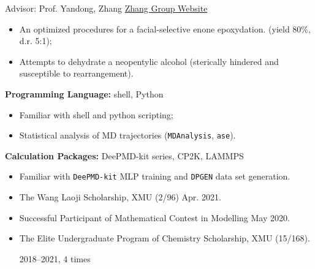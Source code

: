\vspace{5mm}



{\noindent Advisor: Prof. Yandong, Zhang  \hfill \href{https://zhanglab.xmu.edu.cn/}{Zhang Group Website}}


\begin{itemize}
    \item An optimized procedures for a facial-selective enone epoxydation. (yield 80\%, d.r. 5:1);
    \item Attempts to dehydrate a neopentylic alcohol (sterically hindered and susceptible to rearrangement).
\end{itemize}


\vspace{5mm}

\sectionrule
{\noindent \textbf{Programming Language:} }{shell, Python}
\begin{itemize}
    \item Familiar with shell and python scripting; 
    \item Statistical analysis of MD trajectories (\texttt{MDAnalysis}, \texttt{ase}). 
\end{itemize}

{\noindent \textbf{Calculation Packages:} }{DeePMD-kit series, CP2K, LAMMPS}

\begin{itemize}
    \item Familiar with \texttt{DeePMD-kit} MLP training and \texttt{DPGEN} data set generation.
\end{itemize}

\vspace{5mm}
\sectionrule

\begin{itemize}
    \item The Wang Laoji Scholarship, XMU (2/96) \hfill Apr. 2021.
    \item Successful Participant of Mathematical Contest in Modelling \hfill May 2020.
    \item The Elite Undergraduate Program of Chemistry Scholarship, XMU (15/168).
    
        \hspace*{\fill}2018--2021, 4 times
\end{itemize}
